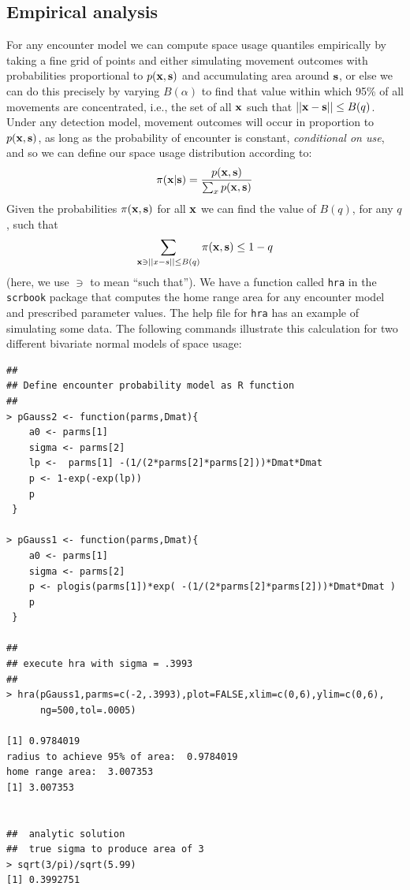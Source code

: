 \subsection{Empirical analysis}

For any encounter model we can compute space usage quantiles
empirically by taking a fine grid of points and either simulating
movement outcomes with probabilities proportional to $p({\bf x},{\bf
  s})$ and accumulating area around ${\bf s}$, or else we can do this
precisely by varying $B(\alpha)$ to find that value within which 95\%
of all movements are concentrated, i.e., the set of all ${\bf x}$ such
that $||{\bf x}-{\bf s}|| \le B(q)$.  Under any detection model,
movement outcomes will occur in proportion to $p({\bf x},{\bf s})$, as
long as the probability of encounter is constant, {\it conditional on
  use}, and so we can define our space usage distribution according
to:
\[
 \pi({\bf x}|{\bf s}) =\frac{p({\bf x},{\bf s})}{\sum_{x} p({\bf
     x},{\bf s}) }
\]
Given the probabilities $\pi({\bf x},{\bf s})$ for all ${\bf x}$ we
can find the value of $B(q)$, for any $q$, such that
\[
\sum_{{\bf x}
  \ni ||x-s|| \le B(q) } \pi({\bf x},{\bf s}) \le 1-q
\]
(here, we use $\ni$ to mean ``such that'').
We have a function called \mbox{\tt hra} in the \mbox{\tt scrbook}
package that computes the home range area for any encounter model and
prescribed parameter values. The help file for \mbox{\tt hra} has an
example of simulating some data.  The following commands illustrate
this calculation for two different bivariate normal models of space
usage:
{\small
\begin{verbatim}
##
## Define encounter probability model as R function
##
> pGauss2 <- function(parms,Dmat){
    a0 <- parms[1]
    sigma <- parms[2]
    lp <-  parms[1] -(1/(2*parms[2]*parms[2]))*Dmat*Dmat
    p <- 1-exp(-exp(lp))
    p
 }

> pGauss1 <- function(parms,Dmat){
    a0 <- parms[1]
    sigma <- parms[2]
    p <- plogis(parms[1])*exp( -(1/(2*parms[2]*parms[2]))*Dmat*Dmat )
    p
 }

##
## execute hra with sigma = .3993
##
> hra(pGauss1,parms=c(-2,.3993),plot=FALSE,xlim=c(0,6),ylim=c(0,6),
      ng=500,tol=.0005)

[1] 0.9784019
radius to achieve 95% of area:  0.9784019
home range area:  3.007353
[1] 3.007353


##  analytic solution
##  true sigma to produce area of 3
> sqrt(3/pi)/sqrt(5.99)
[1] 0.3992751
\end{verbatim}
}
